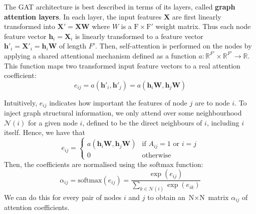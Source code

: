 \documentclass[12pt]{article}
\theoremstyle{definition}
\begin{document}
\bigskip

The GAT architecture is best described in terms of its layers, called \textbf{graph attention layers}. In each layer, the input features $\textbf{X}$ are first linearly transformed into $\textbf{X}' = \textbf{X}\textbf{W}$ where $W$ is a $\textrm{F} \times \textrm{F}'$ weight matrix. Thus each node feature vector $\mathbf{h}_i = \mathbf{X}_i$ is linearly transformed to a feature vector $\mathbf{h}'_i = \mathbf{X}'_i = \mathbf{h}_i \textbf{W}$ of length $F'$. Then, self-attention is performed on the nodes by applying a shared attentional mechanism defined as a function $a: \mathbb{R}^{F'} \times \mathbb{R}^{F'} \to \mathbb{R}$. This function maps two transformed input feature vectors to a real attention coefficient:
\[
e_{ij} = a(\mathbf{h}'_i, \mathbf{h}'_j) = a(\mathbf{h}_i \textbf{W}, \mathbf{h}_j \textbf{W})
\]

Intuitively, $e_{ij}$ indicates how important the features of node $j$ are to node $i$. To inject graph structural information, we only attend over some neighbourhood $\mathcal{N}(i)$ for a given node $i$, defined to be the direct neighbours of $i$, including $i$ itself. Hence, we have that
\begin{equation*}
e_{ij} = \begin{cases}
				a(\mathbf{h}_i \textbf{W}, \mathbf{h}_j \textbf{W}) &\text{if $A_{ij} = 1$ or $i = j$}\\
				0 &\text{otherwise}
			\end{cases}
\end{equation*}
Then, the coefficients are normalised using the softmax function:
\[
\alpha_{ij} = \textrm{softmax}(e_{ij}) = \frac{\exp(e_{ij})}{\sum_{k \in \mathcal{N}(i)} \exp(e_{ik})}
\]
We can do this for every pair of nodes $i$ and $j$ to obtain an $\textrm{N} \times \textrm{N}$ matrix $\alpha_{ij}$ of attention coefficients.

\bigskip
\end{document}

